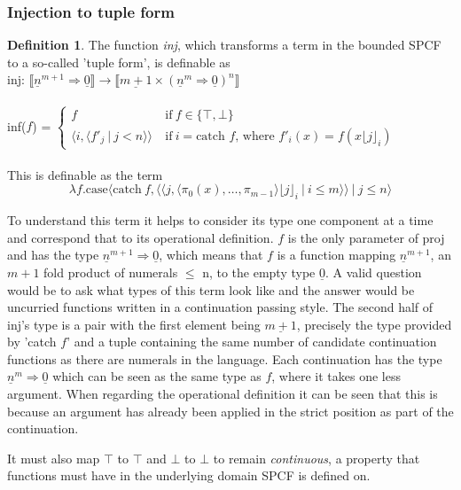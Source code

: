 \documentclass[12pt,a4paper]{report}
\theoremstyle{definition}
\newtheorem{definition}{Definition}[chapter]%
\theoremstyle{remark}
\begin{document}
\subsubsection{Injection to tuple form}
\begin{definition}
    The function \emph{inj}, which transforms a term in the bounded SPCF to a so-called 'tuple form', is definable as \\
    inj: $\llbracket \underline{n}^{m+1} \Rightarrow \underline{0} \rrbracket \rightarrow \llbracket \underline{m + 1} \times (\underline{n}^{m} \Rightarrow \underline{0})^n \rrbracket$\\\\
    inf($f$) =
    $\begin{cases}
        f &\text{if}\ f \in \{\top, \bot\}\\
        \langle i, \langle f'_j\ |\ j < n \rangle \rangle\ &\text{if}\ i = \text{catch } f  \text{, where } f'_i(x) =  f(x \lfloor j \rfloor_i)
    \end{cases}$\\\\
   This is definable as the term
    \[
    \lambda f.\text{case}\langle \text{catch}\ f, \langle \langle j, \langle \pi_0(x),\dots,\pi_{m-1}\rangle \lfloor j \rfloor_i\ |\ i \leq m \rangle \rangle\ |\ j \le n \rangle
    \]
\end{definition}

To understand this term it helps to consider its type one component at a time and correspond that to its operational definition. $f$ is the only parameter of proj and has the type $\underline{n}^{m+1} \Rightarrow \underline{0}$, which means that $f$ is a function mapping $\underline{n}^{m+1}$, an $m+1$ fold product of numerals $\le$ n, to the empty type $\underline{0}$. A valid question would be to ask what types of this term look like and the answer would be uncurried functions written in a continuation passing style. The second half of inj's type is a pair with the first element being $\underline{m+1}$, precisely the type provided by 'catch $f$' and a tuple containing the same number of candidate continuation functions as there are numerals in the language. Each continuation has the type $\underline{n}^{m} \Rightarrow \underline{0}$ which can be seen as the same type as $f$, where it takes one less argument. When regarding the operational definition it can be seen that this is because an argument has already been applied in the strict position as part of the continuation.

It must also map $\top$ to $\top$ and $\bot$ to $\bot$ to remain \emph{continuous}, a property that functions must have in the underlying domain SPCF is defined on.
\end{document}
